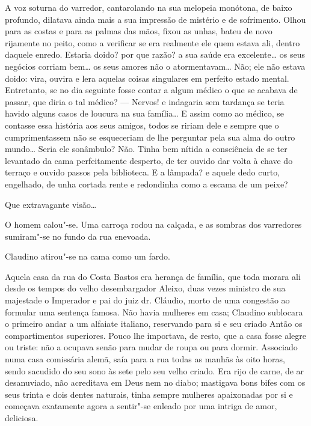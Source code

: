 A voz soturna do varredor, cantarolando na sua melopeia monótona, de
baixo profundo, dilatava ainda mais a sua impressão de mistério e de
sofrimento. Olhou para as costas e para as palmas das mãos, fixou as
unhas, bateu de novo rijamente no peito, como a verificar se era
realmente ele quem estava ali, dentro daquele enredo. Estaria doido? por
que razão? a sua saúde era excelente\ldots{} os seus negócios corriam bem\ldots{}
os seus amores não o atormentavam\ldots{} Não; ele não estava doido: vira,
ouvira e lera aquelas coisas singulares em perfeito estado mental.
Entretanto, se no dia seguinte fosse contar a algum médico o que se
acabava de passar, que diria o tal médico? --- Nervos! e indagaria sem
tardança se teria havido alguns casos de loucura na sua família\ldots{} E
assim como ao médico, se contasse essa história aos seus amigos, todos
se ririam dele e sempre que o cumprimentassem não se esqueceriam de lhe
perguntar pela sua alma do outro mundo\ldots{} Seria ele sonâmbulo? Não.
Tinha bem nítida a consciência de se ter levantado da cama perfeitamente
desperto, de ter ouvido dar volta à chave do terraço e ouvido passos
pela biblioteca. E a lâmpada? e aquele dedo curto, engelhado, de unha
cortada rente e redondinha como a escama de um peixe?

Que extravagante visão\ldots{}

O homem calou"-se. Uma carroça rodou na calçada, e as sombras dos
varredores sumiram"-se no fundo da rua enevoada.

Claudino atirou"-se na cama como um fardo.

\asterisc

Aquela casa da rua do Costa Bastos era herança de família, que toda
morara ali desde os tempos do velho desembargador Aleixo, duas vezes
ministro de sua majestade o Imperador e pai do juiz dr. Cláudio, morto
de uma congestão ao formular uma sentença famosa. Não havia mulheres em
casa; Claudino sublocara o primeiro andar a um alfaiate
italiano, reservando para si e seu criado Antão os compartimentos
superiores. Pouco lhe importava, de resto, que a casa fosse alegre ou
triste: não a ocupava senão para mudar de roupa ou para dormir.
Associado numa casa comissária alemã, saía para a rua todas as manhãs às
oito horas, sendo sacudido do seu sono às sete pelo seu velho criado.
Era rijo de carne, de ar desanuviado, não acreditava em Deus nem no
diabo; mastigava bons bifes com os seus trinta e dois dentes naturais,
tinha sempre mulheres apaixonadas por si e começava exatamente agora a
sentir"-se enleado por uma intriga de amor, deliciosa.

